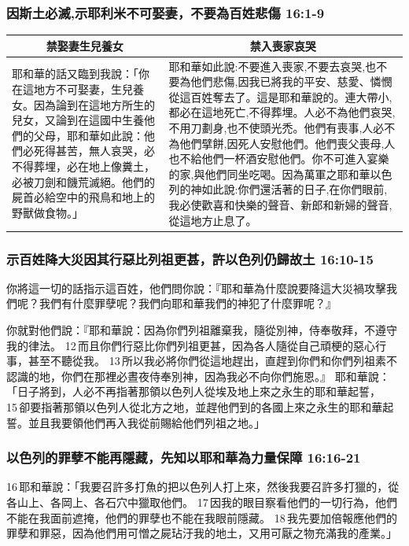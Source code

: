 \subsubsection{因斯土必滅,示耶利米不可娶妻，不要為百姓悲傷 16:1-9}
\begin{table}[H]
\centering
\begin{tabular}{p{6.2cm}|p{}}\hline\hline
\multicolumn{1}{c|}{禁娶妻生兒養女}&\multicolumn{1}{c}{禁入喪家哀哭}\\\hline
耶和華的話又臨到我說：「你在這地方不可娶妻，生兒養女。因為論到在這地方所生的兒女，又論到在這國中生養他們的父母，耶和華如此說：他們必死得甚苦，無人哀哭，必不得葬埋，必在地上像糞土，必被刀劍和饑荒滅絕。他們的屍首必給空中的飛鳥和地上的野獸做食物。」
&耶和華如此說:不要進入喪家,不要去哀哭,也不要為他們悲傷,因我已將我的平安、慈愛、憐憫從這百姓奪去了。這是耶和華說的。連大帶小,都必在這地死亡,不得葬埋。人必不為他們哀哭,不用刀劃身,也不使頭光禿。他們有喪事,人必不為他們擘餅,因死人安慰他們。他們喪父喪母,人也不給他們一杯酒安慰他們。你不可進入宴樂的家,與他們同坐吃喝。因為萬軍之耶和華以色列的神如此說:你們還活著的日子,在你們眼前,我必使歡喜和快樂的聲音、新郎和新婦的聲音,從這地方止息了。\\\hline
\end{tabular}
\end{table}


\subsubsection{示百姓降大災因其行惡比列祖更甚，許以色列仍歸故土 16:10-15}
你將這一切的話指示這百姓，他們問你說：『耶和華為什麼說要降這大災禍攻擊我們呢？我們有什麼罪孽呢？我們向耶和華我們的神犯了什麼罪呢？』

你就對他們說：『耶和華說：因為你們列祖離棄我，隨從別神，侍奉敬拜，不遵守我的律法。 12 而且你們行惡比你們列祖更甚，因為各人隨從自己頑梗的惡心行事，甚至不聽從我。 13 所以我必將你們從這地趕出，直趕到你們和你們列祖素不認識的地，你們在那裡必晝夜侍奉別神，因為我必不向你們施恩。』
耶和華說：「日子將到，人必不再指著那領以色列人從埃及地上來之永生的耶和華起誓， 15 卻要指著那領以色列人從北方之地，並趕他們到的各國上來之永生的耶和華起誓。並且我要領他們再入我從前賜給他們列祖之地。」

\subsubsection{以色列的罪孽不能再隱藏，先知以耶和華為力量保障 16:16-21}
16 耶和華說：「我要召許多打魚的把以色列人打上來，然後我要召許多打獵的，從各山上、各岡上、各石穴中獵取他們。 17 因我的眼目察看他們的一切行為，他們不能在我面前遮掩，他們的罪孽也不能在我眼前隱藏。 18 我先要加倍報應他們的罪孽和罪惡，因為他們用可憎之屍玷汙我的地土，又用可厭之物充滿我的產業。」

